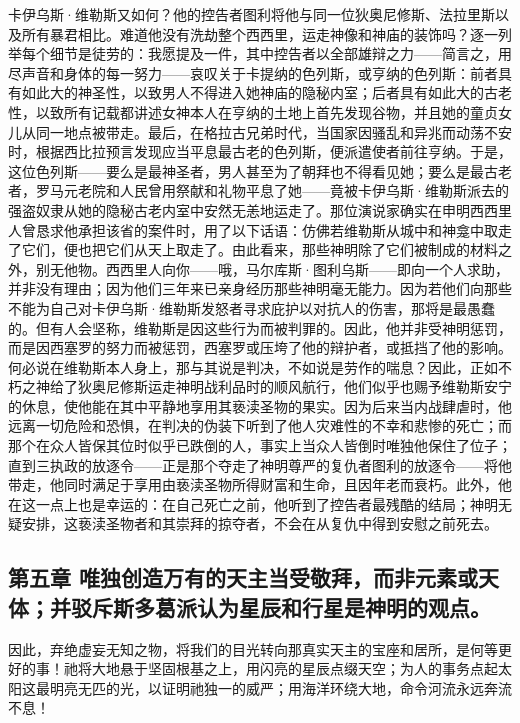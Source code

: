 卡伊乌斯·维勒斯又如何？他的控告者图利将他与同一位狄奥尼修斯、法拉里斯以及所有暴君相比。难道他没有洗劫整个西西里，运走神像和神庙的装饰吗？逐一列举每个细节是徒劳的：我愿提及一件，其中控告者以全部雄辩之力——简言之，用尽声音和身体的每一努力——哀叹关于卡提纳的色列斯，或亨纳的色列斯：前者具有如此大的神圣性，以致男人不得进入她神庙的隐秘内室；后者具有如此大的古老性，以致所有记载都讲述女神本人在亨纳的土地上首先发现谷物，并且她的童贞女儿从同一地点被带走。最后，在格拉古兄弟时代，当国家因骚乱和异兆而动荡不安时，根据西比拉预言发现应当平息最古老的色列斯，便派遣使者前往亨纳。于是，这位色列斯——要么是最神圣者，男人甚至为了朝拜也不得看见她；要么是最古老者，罗马元老院和人民曾用祭献和礼物平息了她——竟被卡伊乌斯·维勒斯派去的强盗奴隶从她的隐秘古老内室中安然无恙地运走了。那位演说家确实在申明西西里人曾恳求他承担该省的案件时，用了以下话语：仿佛若维勒斯从城中和神龛中取走了它们，便也把它们从天上取走了。由此看来，那些神明除了它们被制成的材料之外，别无他物。西西里人向你——哦，马尔库斯·图利乌斯——即向一个人求助，并非没有理由；因为他们三年来已亲身经历那些神明毫无能力。因为若他们向那些不能为自己对卡伊乌斯·维勒斯发怒者寻求庇护以对抗人的伤害，那将是最愚蠢的。但有人会坚称，维勒斯是因这些行为而被判罪的。因此，他并非受神明惩罚，而是因西塞罗的努力而被惩罚，西塞罗或压垮了他的辩护者，或抵挡了他的影响。何必说在维勒斯本人身上，那与其说是判决，不如说是劳作的喘息？因此，正如不朽之神给了狄奥尼修斯运走神明战利品时的顺风航行，他们似乎也赐予维勒斯安宁的休息，使他能在其中平静地享用其亵渎圣物的果实。因为后来当内战肆虐时，他远离一切危险和恐惧，在判决的伪装下听到了他人灾难性的不幸和悲惨的死亡；而那个在众人皆保其位时似乎已跌倒的人，事实上当众人皆倒时唯独他保住了位子；直到三执政的放逐令——正是那个夺走了神明尊严的复仇者图利的放逐令——将他带走，他同时满足于享用由亵渎圣物所得财富和生命，且因年老而衰朽。此外，他在这一点上也是幸运的：在自己死亡之前，他听到了控告者最残酷的结局；神明无疑安排，这亵渎圣物者和其崇拜的掠夺者，不会在从复仇中得到安慰之前死去。\par


\subsection{第五章  唯独创造万有的天主当受敬拜，而非元素或天体；并驳斥斯多葛派认为星辰和行星是神明的观点。}

因此，弃绝虚妄无知之物，将我们的目光转向那真实天主的宝座和居所，是何等更好的事！祂将大地悬于坚固根基之上，用闪亮的星辰点缀天空；为人的事务点起太阳这最明亮无匹的光，以证明祂独一的威严；用海洋环绕大地，命令河流永远奔流不息！\par

